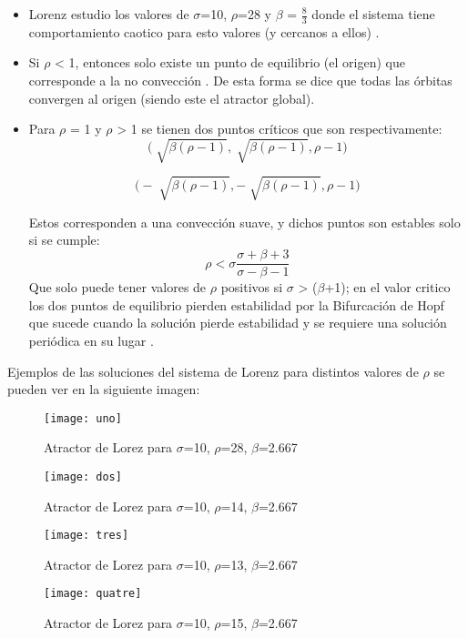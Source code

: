 \documentclass[12pt,letterpaper]{article}
\begin{document}
\begin{itemize}
\item Lorenz estudio los valores de $\sigma$=10, $\rho$=28 y $\beta$ = $\frac{8}{3}$ donde el sistema tiene comportamiento caotico para esto valores (y cercanos a ellos) \cite{a}.
\item Si $\rho$ < 1, entonces solo existe un punto de equilibrio (el origen) que corresponde a la no convección \cite{a}. De esta forma se dice que todas las órbitas convergen al origen (siendo este el atractor global).
\item Para $\rho$ = 1 y $\rho$ > 1 se tienen dos puntos críticos que son respectivamente:
$$\bigg( \sqrt[]{\beta(\rho - 1)},\sqrt[]{\beta(\rho - 1)} , \rho - 1 \bigg)$$

$$\bigg( -\sqrt[]{\beta(\rho - 1)},-\sqrt[]{\beta(\rho - 1)} , \rho - 1 \bigg)$$

Estos corresponden a una convección suave, y dichos puntos son estables solo si se cumple:
$$ \rho < \sigma \frac{\sigma + \beta + 3}{\sigma - \beta - 1}$$
Que solo puede tener valores de $\rho$ positivos si  $\sigma$ > ($\beta$+1); en el valor critico los dos puntos de equilibrio pierden estabilidad por la Bifurcación de Hopf que sucede cuando la solución pierde estabilidad y se requiere una solución periódica en su lugar \cite{b}.
\end{itemize}

Ejemplos de las soluciones del sistema de Lorenz para distintos valores de $\rho$ se pueden ver en la siguiente imagen:

\begin{figure}[H]
	\centering
	\texttt{[image: uno]}
	\caption{Atractor de Lorez para $\sigma$=10, $\rho$=28, $\beta$=2.667}
\end{figure}

\begin{figure}[H]
	\centering
	\texttt{[image: dos]}
	\caption{Atractor de Lorez para $\sigma$=10, $\rho$=14, $\beta$=2.667}
\end{figure}

\begin{figure}[H]
	\centering
	\texttt{[image: tres]}
	\caption{Atractor de Lorez para $\sigma$=10, $\rho$=13, $\beta$=2.667}
\end{figure}

\begin{figure}[H]
	\centering
	\texttt{[image: quatre]}
	\caption{Atractor de Lorez para $\sigma$=10, $\rho$=15, $\beta$=2.667}
\end{figure}
\end{document}
